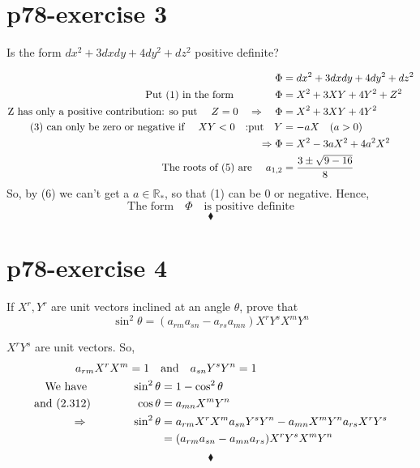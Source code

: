 \section{p78-exercise 3}
\begin{tcolorbox}
Is the form $dx^2+3dxdy+4dy^2+dz^2$ positive definite?
\end{tcolorbox}
\begin{align}
\Phi &= dx^2+3dxdy+4dy^2+dz^2\\
\text{Put (1) in the form}\quad\quad\quad\quad  \Phi &= X^2+3XY+4Y^2+Z^2\\
\text{Z has only a positive contribution: so put }\quad Z=0\quad\Rightarrow \quad \Phi &= X^2+3XY+4Y^2\\
\text{(3) can only be zero or negative if }\quad XY < 0\quad\text{:put}\quad Y & =-aX\quad (a>0)\\
\Rightarrow \Phi &= X^2-3aX^2 +4a^2X^2\\
\text{The roots of (5) are }\quad a_{1,2} &= \frac{3\pm \sqrt{9-16}}{8}
\end{align}
So, by (6) we can't get a $a \in \mathbb{R}_*$, so that (1) can be $0$ or negative. Hence,
$$\text{The form}\quad \Phi \quad \text{is positive definite}$$
$$\blacklozenge$$
\newpage

\section{p78-exercise 4}
\begin{tcolorbox}
If $X^r, Y^r$ are unit vectors inclined at an angle $\theta$, prove that $$\sin^2 \theta = (a_{rm}a_{sn}- a_{rs}a_{mn})X^r Y^s X^m Y^n$$
\end{tcolorbox}
$X^r Y^s$ are unit vectors. So,
\begin{align}
\ a_{rm}X^rX^m = 1 \quad &\text{and}\quad a_{sn}Y^sY^n = 1\\
\text{We have}\quad\quad\quad\quad \sin^2\theta &= 1 - \cos^2\theta\\
\text{and (2.312)}\quad\quad\quad\quad \cos\theta &= a_{mn}X^mY^n\\
\Rightarrow\quad\quad\quad\quad \sin^2 \theta &= a_{rm}X^rX^m a_{sn}Y^sY^n - a_{mn}X^mY^na_{rs}X^rY^s\\
\ &= (a_{rm} a_{sn} - a_{mn}a_{rs})X^rY^sX^mY^n
\end{align}
$$\blacklozenge$$
\newpage

